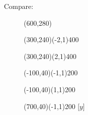 \documentclass[12pt]{article}
\newcommand{\n}{\noindent}
\newcommand{\s}{\vspace{5mm}}
\begin{document}
\s
\n  Compare:

\begin{figure}[htb]
\hspace*{\fill}
\begin{egame}(600,280)

\renewcommand{\egarrowstyle}{}

\putbranch(300,240)(-2,1){400}
\ib{}{}

\renewcommand{\egarrowstyle}{e}

\putbranch(300,240)(2,1){400}
\ib{}{}

\renewcommand{\egarrowstyle}{e}

\putbranch(-100,40)(-1,1){200}
\ib{}{} 

\renewcommand{\egarrowstyle}{}

\putbranch(-100,40)(1,1){200}
\ib{}{} 

\renewcommand{\egarrowstyle}{}

\putbranch(700,40)(-1,1){200}
\ib{}{}[$y$] 

\renewcommand{\egarrowstyle}{e}


\end{egame}
\end{figure}
\end{document}
